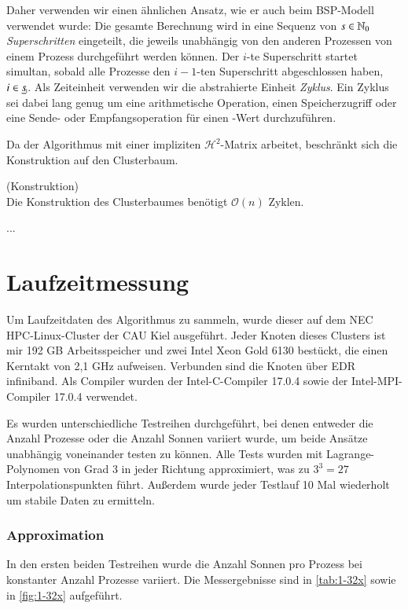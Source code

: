   Daher verwenden wir einen ähnlichen Ansatz, wie er auch beim BSP-Modell \citep{bsp} verwendet wurde: Die gesamte Berechnung wird in eine Sequenz von $s \in \mathbb{N}_0$ \textit{Superschritten} eingeteilt,
  die jeweils unabhängig von den anderen Prozessen von einem Prozess durchgeführt werden können. Der $i$-te Superschritt startet simultan, sobald alle Prozesse den $i-1$-ten Superschritt abgeschlossen
  haben, $i \in \haken{s}$. Als Zeiteinheit verwenden wir die abstrahierte Einheit \textit{Zyklus}. Ein Zyklus sei dabei lang genug um eine arithmetische Operation, einen Speicherzugriff oder eine Sende-
  oder Empfangsoperation für einen -Wert durchzuführen.
  
  Da der Algorithmus mit einer impliziten $\mathcal{H}^2$-Matrix arbeitet, beschränkt sich die Konstruktion auf den Clusterbaum.
  
  \begin{lem}
    (Konstruktion)\\
    Die Konstruktion des Clusterbaumes benötigt $\mathcal{O}(n)$ Zyklen.
  \end{lem}
  
  ...
  
  \section{Laufzeitmessung}
  Um Laufzeitdaten des Algorithmus zu sammeln, wurde dieser auf dem NEC HPC-Linux-Cluster der CAU Kiel ausgeführt. Jeder Knoten dieses Clusters ist mir 192 GB Arbeitsspeicher und zwei Intel Xeon Gold 
  6130 bestückt, die einen Kerntakt von 2,1 GHz aufweisen. Verbunden sind die Knoten über EDR infiniband. Als Compiler wurden der Intel-C-Compiler 17.0.4 sowie der Intel-MPI-Compiler 17.0.4 verwendet.
  
  Es wurden unterschiedliche Testreihen durchgeführt, bei denen entweder die Anzahl Prozesse oder die Anzahl Sonnen variiert wurde, um beide Ansätze unabhängig voneinander testen zu können.
  Alle Tests wurden mit Lagrange-Polynomen von Grad $3$ in jeder Richtung approximiert, was zu $3^3 = 27$ Interpolationspunkten führt. Außerdem wurde jeder Testlauf 10 Mal wiederholt um stabile Daten
  zu ermitteln.
  
  \subsubsection{Approximation}
  
  In den ersten beiden Testreihen wurde die Anzahl Sonnen pro Prozess bei konstanter Anzahl Prozesse variiert. Die Messergebnisse sind in \autoref{tab:1-32x} sowie in \autoref{fig:1-32x} 
  aufgeführt.
  
